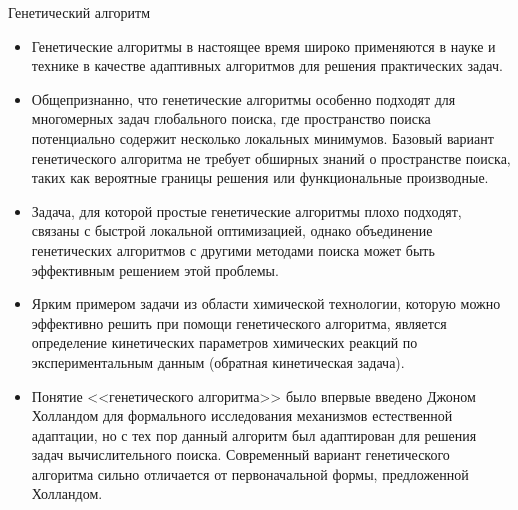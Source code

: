 \documentclass[aspectratio=169, mathserif]{beamer}	%
\begin{document}
\begin{frame}[fragile]{Генетический алгоритм}
\scriptsize
\begin{itemize}
	\item Генетические алгоритмы в настоящее время широко применяются в науке и технике в качестве адаптивных алгоритмов для решения практических задач.

	\item Общепризнанно, что генетические алгоритмы особенно подходят для многомерных задач глобального поиска, где пространство поиска потенциально содержит несколько локальных минимумов. Базовый вариант генетического алгоритма не требует обширных знаний о пространстве поиска, таких как вероятные границы решения или функциональные производные.

	\item Задача, для которой простые генетические алгоритмы плохо подходят, связаны с быстрой локальной оптимизацией, однако объединение генетических алгоритмов с другими методами поиска может быть эффективным решением этой проблемы.

	\item Ярким примером задачи из области химической технологии, которую можно эффективно решить при помощи генетического алгоритма, является определение кинетических параметров химических реакций по экспериментальным данным (обратная кинетическая задача).

	\item Понятие <<генетического алгоритма>> было впервые введено Джоном Холландом для формального исследования механизмов естественной адаптации, но с тех пор данный алгоритм был адаптирован для решения задач вычислительного поиска. Современный вариант генетического алгоритма сильно отличается от первоначальной формы, предложенной Холландом.
\end{itemize}
\vfill
\end{frame}
\end{document}
